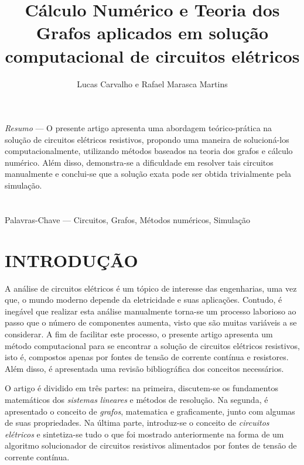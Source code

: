 \documentclass[twocolumn, 10pt]{extarticle}
\begin{document}
\singlespacing

\title{Cálculo Numérico e Teoria dos Grafos aplicados em solução computacional de circuitos elétricos}
\date{}
\author{Lucas Carvalho e Rafael Marasca Martins}

\maketitle

\thispagestyle{empty}

\begin{bfseries}
\small
\textit{Resumo} — O presente artigo apresenta uma abordagem teórico-prática na solução de circuitos elétricos resistivos, propondo uma maneira de solucioná-los computacionalmente, utilizando métodos baseados na teoria dos grafos  e cálculo numérico. Além disso, demonstra-se a dificuldade em resolver tais circuitos manualmente e conclui-se que a solução exata pode ser obtida trivialmente pela simulação.
\\~\\~\\
Palavras-Chave — Circuitos, Grafos, Métodos numéricos, Simulação
\end{bfseries}

\section{INTRODUÇÃO}
A análise de circuitos elétricos é um tópico de interesse das engenharias, uma vez que, o mundo moderno depende da eletricidade e suas aplicações. Contudo, é inegável que realizar esta análise manualmente torna-se um processo laborioso ao passo que o número de componentes aumenta, visto que são muitas variáveis a se considerar. A fim de facilitar este processo, o presente artigo apresenta um método computacional para se encontrar a solução de circuitos elétricos resistivos, isto é, compostos apenas por fontes de tensão de corrente contínua e resistores. Além disso, é apresentada uma revisão bibliográfica dos conceitos necessários.

O artigo é dividido em três partes: na primeira, discutem-se os fundamentos matemáticos dos \textit{sistemas lineares} e métodos de resolução. Na segunda, é apresentado o conceito de \textit{grafos}, matematica e graficamente, junto com algumas de suas propriedades. Na última parte, introduz-se o conceito de \textit{circuitos elétricos} e sintetiza-se tudo o que foi mostrado anteriormente na forma de um algoritmo solucionador de circuitos resistivos alimentados por fontes de tensão de corrente contínua.
\end{document}
